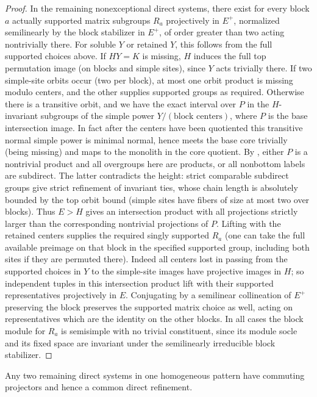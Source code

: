 \begin{proof}
In the remaining nonexceptional direct systems, there exist for every block \(a\) actually supported matrix subgroups \(R_a\) projectively in \(E^+\), normalized semilinearly by the block stabilizer in \(E^+\), of order greater than two acting nontrivially there. For soluble \(Y\) or retained \(Y\), this follows from the full supported choices above. If \(HY=K\) is missing, \(H\) induces the full top permutation image (on blocks and simple sites), since \(Y\) acts trivially there. If two simple-site orbits occur (two per block), at most one orbit product is missing modulo centers, and the other supplies supported groups as required. Otherwise there is a transitive orbit, and we have the exact interval over \(P\) in the \(H\)-invariant subgroups of the simple power \(Y/(\text{block centers})\), where \(P\) is the base intersection image. In fact after the centers have been quotiented this transitive normal simple power is minimal normal, hence meets the base core trivially (being missing) and maps to the monolith in the core quotient. By , either \(P\) is a nontrivial product and all overgroups here are products, or all nonbottom labels are subdirect. The latter contradicts the height: strict comparable subdirect groups give strict refinement of invariant ties, whose chain length is absolutely bounded by the top orbit bound (simple sites have fibers of size at most two over blocks). Thus \(E>H\) gives an intersection product with all projections strictly larger than the corresponding nontrivial projections of \(P\). Lifting with the retained centers supplies the required singly supported \(R_a\) (one can take the full available preimage on that block in the specified supported group, including both sites if they are permuted there). Indeed all centers lost in passing from the supported choices in \(Y\) to the simple-site images have projective images in \(H\); so independent tuples in this intersection product lift with their supported representatives projectively in \(E\). Conjugating by a semilinear collineation of \(E^+\) preserving the block preserves the supported matrix choice as well, acting on representatives which are the identity on the other blocks. In all cases the block module for \(R_a\) is semisimple with no trivial constituent, since its module socle and its fixed space are invariant under the semilinearly irreducible block stabilizer.
\end{proof}

\begin{lemma}\label{c:direct-compatibility}
Any two remaining direct systems in one homogeneous pattern have commuting projectors and hence a common direct refinement.
\end{lemma}

